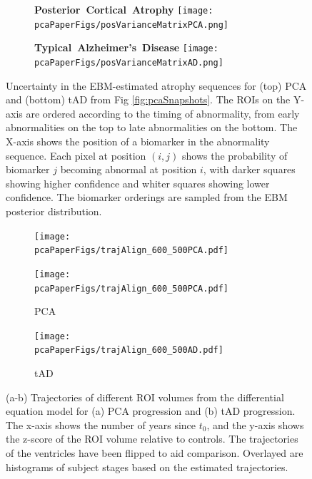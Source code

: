 \begin{figure}
\centering
  \begin{subfigure}{0.7\textwidth}
  \centering
 \textbf{\large{\mbox{Posterior Cortical Atrophy}}}
 \texttt{[image: \\pcaPaperFigs/posVarianceMatrixPCA.png]} 
 \end{subfigure}
 \hspace{1em}
  \begin{subfigure}{0.7\textwidth}
  \centering
  \textbf{\large{\mbox{Typical Alzheimer's Disease}}}
 \texttt{[image: \\pcaPaperFigs/posVarianceMatrixAD.png]}
 \end{subfigure}
 \caption[PCA and tAD positional variance diagrams estimated by the EBM]{Uncertainty in the EBM-estimated atrophy sequences for (top) PCA and (bottom) tAD from Fig \ref{fig:pcaSnapshots}. The ROIs on the Y-axis are ordered according to the timing of abnormality, from early abnormalities on the top to late abnormalities on the bottom. The X-axis shows the position of a biomarker in the abnormality sequence. Each pixel at position $(i,j)$ shows the probability of biomarker $j$ becoming abnormal at position $i$, with darker squares showing higher confidence and whiter squares showing lower confidence. The biomarker orderings are sampled from the EBM posterior distribution.}
 \label{fig:pcaEBMProg}
\end{figure}

\begin{figure}
 \centering
\begin{subfigure}{0.8\textwidth}
 \centering
 \texttt{[image: \\pcaPaperFigs/trajAlign\_600\_500PCA.pdf]}
\end{subfigure}
 
 \begin{subfigure}{0.47\textwidth}
\texttt{[image: \\pcaPaperFigs/trajAlign\_600\_500PCA.pdf]}
 \caption{PCA}
 \label{trajDEMPCA} 
 \end{subfigure}
 \begin{subfigure}{0.47\textwidth}
 \texttt{[image: \\pcaPaperFigs/trajAlign\_600\_500AD.pdf]}
 \caption{tAD}
 \label{trajDEMAD}
 \end{subfigure}
 \caption[PCA and tAD trajectories estimated by the DEM]{(a-b) Trajectories of different ROI volumes from the differential equation model for (a) PCA progression and (b) tAD progression. The x-axis shows the number of years since $t_0$, and the y-axis shows the z-score of the ROI volume relative to controls. The trajectories of the ventricles have been flipped to aid comparison. Overlayed are histograms of subject stages based on the estimated trajectories.}
 \label{fig:pcaAdDEM}
\end{figure}

